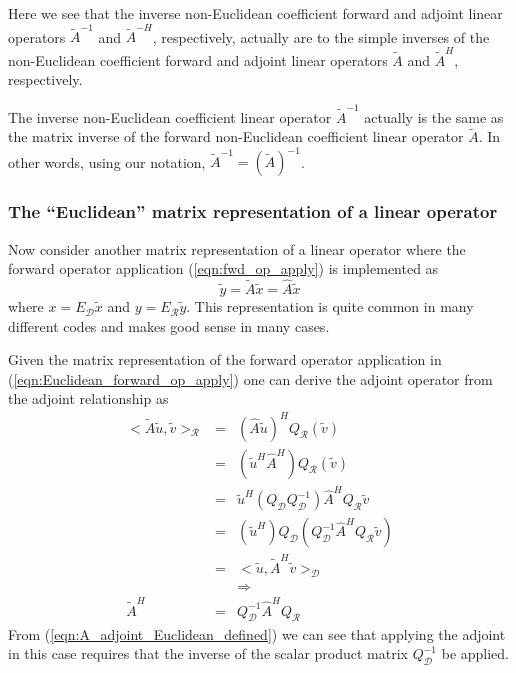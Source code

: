 Here we see that the inverse non-Euclidean coefficient forward and adjoint
linear operators $\tilde{A}^{-1} $ and $\tilde{A}^{-H}$, respectively,
actually are to the simple inverses of the non-Euclidean coefficient forward
and adjoint linear operators $\tilde{A} $ and $\tilde{A}^H$, respectively.

\begin{dumb_fact}
The inverse non-Euclidean coefficient linear operator $\tilde{A}^{-1}$
actually is the same as the matrix inverse of the forward non-Euclidean
coefficient linear operator $\tilde{A}$.  In other words, using our notation,
$\tilde{A}^{-1} = (\tilde{A})^{-1}$.
\end{dumb_fact}

\subsubsection{The ``Euclidean'' matrix representation of a linear operator}
\label{sec:Euclidean_matrix_rep_linear_operator}

Now consider another matrix representation of a linear operator where the
forward operator application (\ref{eqn:fwd_op_apply}) is implemented as
%
\begin{equation}
\tilde{y} = \tilde{A} \tilde{x} = \hat{A} \tilde{x}
\label{eqn:Euclidean_forward_op_apply}
\end{equation}
%
where $x = E_{\mathcal{D}}\tilde{x}$ and $y = E_{\mathcal{R}}\tilde{y}$.  This
representation is quite common in many different codes and makes good sense in
many cases.

Given the matrix representation of the forward operator application in
(\ref{eqn:Euclidean_forward_op_apply}) one can derive the adjoint operator
from the adjoint relationship as
%
\begin{eqnarray}
<\tilde{A} \tilde{u}, \tilde{v}>_{\mathcal{R}}
& = & ( \hat{A} \tilde{u} )^H Q_{\mathcal{R}} (\tilde{v}) \nonumber \\
& = & ( \tilde{u}^H \hat{A}^H ) Q_{\mathcal{R}} (\tilde{v}) \nonumber \\
& = & \tilde{u}^H ( Q_{\mathcal{D}} Q_{\mathcal{D}}^{-1} ) \hat{A}^H Q_{\mathcal{R}} \tilde{v} \nonumber \\
& = & ( \tilde{u}^H ) Q_{\mathcal{D}} ( Q_{\mathcal{D}}^{-1} \hat{A}^H Q_{\mathcal{R}} \tilde{v} ) \nonumber \\
& = & <\tilde{u}, \tilde{A}^H \tilde{v}>_{\mathcal{D}} \nonumber \\
&  & \Rightarrow \nonumber \\
\tilde{A}^H & = & Q_{\mathcal{D}}^{-1} \hat{A}^H Q_{\mathcal{R}}
\label{eqn:A_adjoint_Euclidean_defined}
\end{eqnarray}
%
From (\ref{eqn:A_adjoint_Euclidean_defined}) we can see that applying the
adjoint in this case requires that the inverse of the scalar product matrix
$Q_{\mathcal{D}}^{-1}$ be applied.

